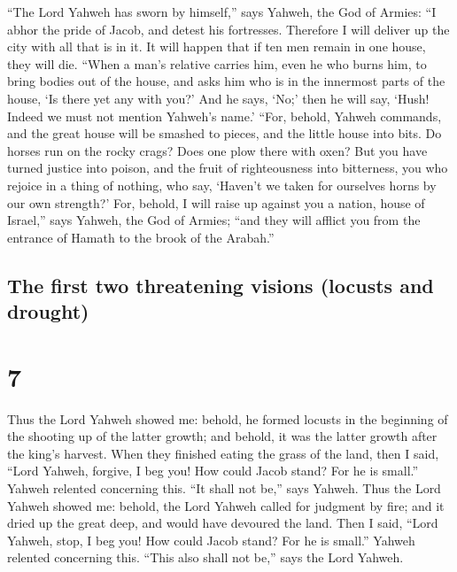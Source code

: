  ``The Lord Yahweh has sworn by himself,'' says Yahweh,
the God of Armies: ``I abhor the pride of Jacob, and detest his
fortresses. Therefore I will deliver up the city with all that is in it.
 It will happen that if ten men remain in one house, they
will die.  ``When a man's relative carries him, even he
who burns him, to bring bodies out of the house, and asks him who is in
the innermost parts of the house, `Is there yet any with you?' And he
says, `No;' then he will say, `Hush! Indeed we must not mention Yahweh's
name.'  ``For, behold, Yahweh commands, and the great
house will be smashed to pieces, and the little house into bits.
 Do horses run on the rocky crags? Does one plow there
with oxen? But you have turned justice into poison, and the fruit of
righteousness into bitterness,  you who rejoice in a
thing of nothing, who say, `Haven't we taken for ourselves horns by our
own strength?'  For, behold, I will raise up against you
a nation, house of Israel,'' says Yahweh, the God of Armies; ``and they
will afflict you from the entrance of Hamath to the brook of the
Arabah.''

\hypertarget{the-first-two-threatening-visions-locusts-and-drought}{%
\subsection{The first two threatening visions (locusts and
drought)}\label{the-first-two-threatening-visions-locusts-and-drought}}

\hypertarget{section-6}{%
\section{7}\label{section-6}}

 Thus the Lord Yahweh showed me: behold, he formed locusts
in the beginning of the shooting up of the latter growth; and behold, it
was the latter growth after the king's harvest.  When they
finished eating the grass of the land, then I said, ``Lord Yahweh,
forgive, I beg you! How could Jacob stand? For he is small.''
 Yahweh relented concerning this. ``It shall not be,''
says Yahweh.  Thus the Lord Yahweh showed me: behold, the
Lord Yahweh called for judgment by fire; and it dried up the great deep,
and would have devoured the land.  Then I said, ``Lord
Yahweh, stop, I beg you! How could Jacob stand? For he is small.''
 Yahweh relented concerning this. ``This also shall not
be,'' says the Lord Yahweh.

